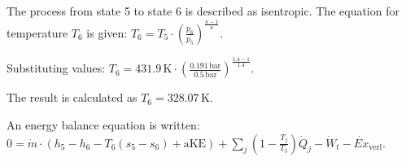 The process from state 5 to state 6 is described as isentropic. The equation for temperature \( T_6 \) is given:  
\( T_6 = T_5 \cdot \left( \frac{p_6}{p_5} \right)^{\frac{\kappa - 1}{\kappa}} \).  

Substituting values:  
\( T_6 = 431.9 \, \text{K} \cdot \left( \frac{0.191 \, \text{bar}}{0.5 \, \text{bar}} \right)^{\frac{1.4 - 1}{1.4}} \).  

The result is calculated as \( T_6 = 328.07 \, \text{K} \).  

An energy balance equation is written:  
\( 0 = \dot{m} \cdot (h_5 - h_6 - T_6(s_5 - s_6) + \text{aKE}) + \sum_j \left( 1 - \frac{T_j}{T_5} \right) \dot{Q}_j - \dot{W}_t - \dot{Ex}_{\text{verl}} \).